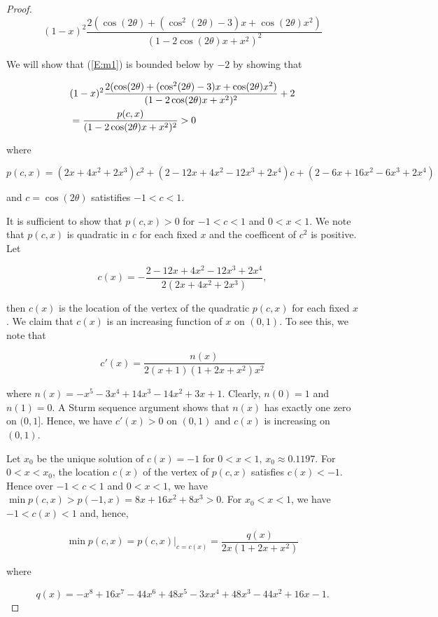 \documentclass{lms}
\numberwithin{equation}{section}
\begin{document}
\begin{proof}
\begin{equation} \label{E:m1}
(1-x)^{2} \frac{2( \cos(2\theta) 
+ (\cos^2(2\theta) -3)x 
+ \cos(2\theta) x^2)}{(1-2\cos(2\theta)x +x^2)^2}
\end{equation}

We will show that (\ref{E:m1}) is bounded below by $-2$ by showing that 

\begin{align}\notag
&(1-x)^{2} \frac{2( \cos(2\theta) 
+ (\cos^2(2\theta) -3)x 
+ \cos(2\theta) x^2)}{(1-2\cos(2\theta)x +x^2)^2} + 2 \\ \notag
&= \frac{p(c,x)}{(1-2\cos(2\theta)x +x^2)^2} > 0
\end{align}

\noindent where

$$
 p(c,x) = (2x+4x^2 + 2x^3)c^2 + (2-12x+4x^2-12x^3+2x^4)c + (2-6x+16x^2-6x^3+2x^4)
$$

\noindent and $c = \cos(2\theta)$ satistifies $-1 < c < 1$.  

It is sufficient to show that $p(c,x) > 0$ for $-1 < c < 1$ and $0 < x < 1$.
We note that $p(c,x)$ is quadratic in $c$ for each fixed $x$ and the coefficent 
of $c^2$ is positive.  Let 

$$
c(x) = -\frac{2-12x+4x^2-12x^3+2x^4}{2(2x+4x^2 + 2x^3)},
$$

\noindent then $c(x)$ is the location of the vertex of the quadratic $p(c,x)$ for each fixed $x$.
We claim that $c(x)$ is an increasing function of $x$ on $(0,1)$.  To see this, we note that

$$c'(x) = \frac{n(x)}{2(x+1)(1+2x+x^2)x^2}$$

\noindent where $n(x) = -x^5-3x^4+14x^3-14x^2+3x+1$.  Clearly, $n(0) = 1$ and $n(1) = 0$.  A Sturm sequence argument shows that $n(x)$ has exactly one zero on $(0,1]$.  Hence, we have $c'(x) > 0$ on 
$(0,1)$ and $c(x)$ is increasing on $(0,1)$.

Let $x_0$ be the unique solution of $c(x) = -1$ 
for $0 < x < 1$, $x_0 \approx 0.1197$. 
For $0 < x < x_0$, the location $c(x)$ of the vertex of $p(c,x)$ satisfies $c(x) < -1$.  
Hence over $-1 < c < 1$ and $0 < x < 1$, 
we have $ \min p(c,x) > p(-1,x) = 8x + 16x^2 +8x^3 > 0$.  For $x_0 < x < 1$, we have
$-1 < c(x) < 1$ and, hence, 

$$ \min p(c,x) = p(c,x)|_{c=c(x)} = \frac{q(x)}{2x(1+2x+x^2)} $$

\noindent where

$$ 
q(x) = -x^8 + 16x^7 - 44x^6 + 48x^5 - 3xx^4 +48x^3-44x^2+16x -1.
$$


\end{proof}
\end{document}
